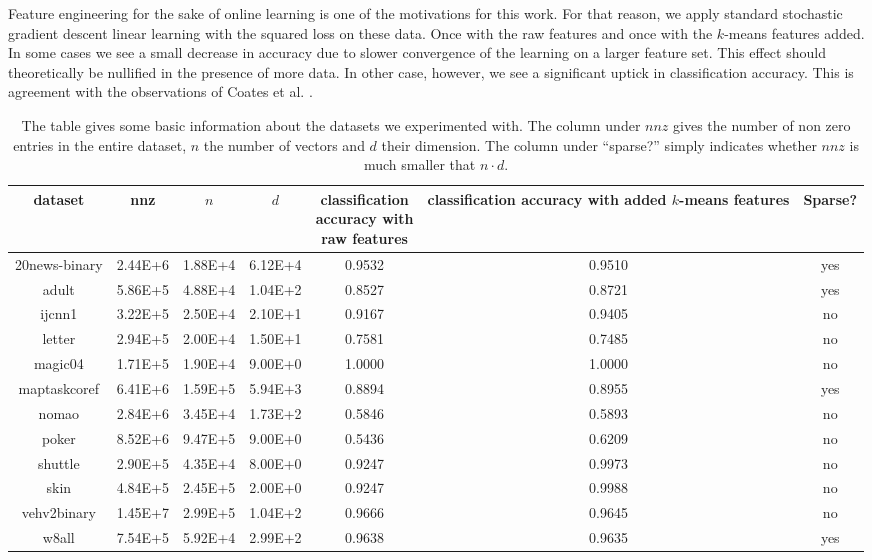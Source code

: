 \documentclass[11pt,twoside]{article}
\begin{document}
Feature engineering for the sake of online learning is one of the motivations for this work.
For that reason, we apply standard stochastic gradient descent linear learning with the squared loss on these data.
Once with the raw features and once with the $k$-means features added. 
In some cases we see a small decrease in accuracy due to slower convergence of the learning on a larger feature set.
This effect should theoretically be nullified in the presence of more data.
In other case, however, we see a significant uptick in classification accuracy. This is agreement with the observations of Coates et al. \cite{CoatesNL11}.

\newcommand{\ttt}[2]{ \parbox{#1pt}{\vspace{0.1cm} \noindent  #2 \vspace{0.1cm}}}
\begin{table}[htdp]
\begin{center}
\begin{tabular}{|c|c|c|c|c|c|c|} \hline
dataset		&	nnz		& $n$	&	$d$	& \ttt{70}{classification \\ accuracy  with  \\ raw features}  & \ttt{90}{classification \\ accuracy with added \\ $k$-means features}	& Sparse?		\\ \hline
20news-binary	&	2.44E+6	&	1.88E+4	&	6.12E+4	& 0.9532	& 0.9510	& yes			\\ \hline %
adult			&	5.86E+5	&	4.88E+4	&	1.04E+2	& 0.8527	& 0.8721	& yes			\\ \hline
ijcnn1		&	3.22E+5	&	2.50E+4	&	2.10E+1	& 0.9167	& 0.9405	& no			\\ \hline %
letter			&	2.94E+5	&	2.00E+4	&	1.50E+1	& 0.7581	& 0.7485	&no			\\ \hline
magic04		&	1.71E+5	&	1.90E+4	&	9.00E+0	& 1.0000	& 1.0000	&no		 	\\ \hline
maptaskcoref	&	6.41E+6	&	1.59E+5	&	5.94E+3	& 0.8894  & 0.8955	&yes		 	\\ \hline
nomao		&	2.84E+6	&	3.45E+4	&	1.73E+2	& 0.5846	& 0.5893	&no		 	\\ \hline
poker		&	8.52E+6	&	9.47E+5	&	9.00E+0	& 0.5436	& 0.6209	&no		  	\\ \hline
shuttle		&	2.90E+5	&	4.35E+4	&	8.00E+0	& 0.9247	& 0.9973	&no		 	\\ \hline
skin			&	4.84E+5	&	2.45E+5	&	2.00E+0	& 0.9247	& 0.9988	&no		 	\\ \hline
vehv2binary	&	1.45E+7	&	2.99E+5	&	1.04E+2	& 0.9666	& 0.9645	&no		 	\\ \hline
w8all			&	7.54E+5	&	5.92E+4	&	2.99E+2	& 0.9638	& 0.9635	&yes		 	\\ \hline
\end{tabular}
\end{center}
\caption{The table gives some basic information about the datasets we experimented with. 
The column under $nnz$ gives the number of non zero entries in the entire dataset, $n$ the number of vectors and $d$ their dimension.
The column under ``sparse?'' simply indicates whether $nnz$ is much smaller that $n\cdot d$.}
\label{table1}
\end{table}%
\end{document}
